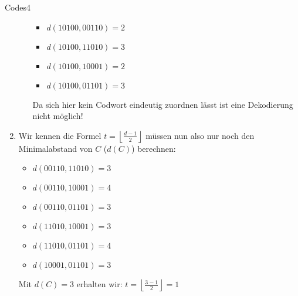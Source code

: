 \begin{aufgabe}{Codes}{4}
\begin{enumerate}[label=\alph*)]
\begin{itemize}[label=--]
\begin{multicols}{2}
\begin{itemize}[label=]
                \item \(d(10100, 00110) = 2\)
                \item \(d(10100, 11010) = 3\)
                \item \(d(10100, 10001) = 2\)
                \item \(d(10100, 01101) = 3\)
            \end{itemize}
        \end{multicols}
        Da sich hier kein Codwort eindeutig zuordnen lässt ist eine Dekodierung nicht möglich!
    \end{itemize}
    \item Wir kennen die Formel \(t = \left\lfloor \frac{d-1}{2}\right\rfloor \) müssen nun also nur noch den Minimalabstand von $C$ ($d(C)$) berechnen: 
    \begin{multicols}{3}
        \begin{itemize}[label=]\narrowitems
            \item \(d(00110, 11010) = 3\)
            \item \(d(00110, 10001) = 4\)
            \item \(d(00110, 01101) = 3\)
            \item \(d(11010, 10001) = 3\)
            \item \(d(11010, 01101) = 4\)
            \item \(d(10001, 01101) = 3\)
        \end{itemize}
    \end{multicols}
    Mit $d(C) = 3$ erhalten wir: \(t = \left\lfloor \frac{3-1}{2}\right\rfloor = 1\)
\end{enumerate}
\end{aufgabe}
\newpage

